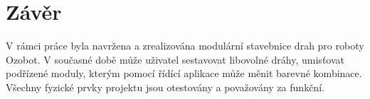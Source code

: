 \chapter{Závěr}
            V rámci práce byla navržena a zrealizována modulární stavebnice drah pro roboty Ozobot. V současné době může uživatel sestavovat libovolné dráhy, umisťovat podřízené moduly, kterým pomocí řídící aplikace může měnit barevné kombinace. Všechny fyzické prvky projektu jsou otestovány a považovány za funkční. 